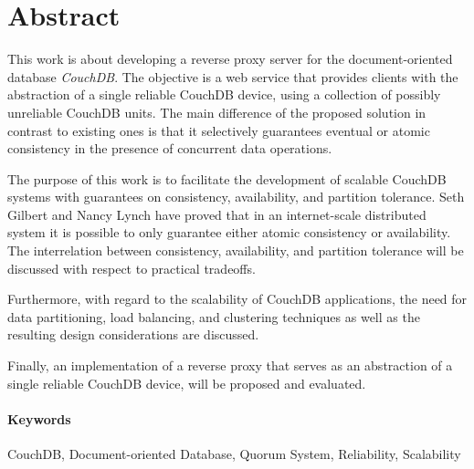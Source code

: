 \section*{Abstract}
This work is about developing a reverse proxy server for the document-oriented database \emph{CouchDB}. The objective is a web service that provides clients with the abstraction of a single reliable CouchDB device, using a collection of possibly unreliable CouchDB units. The main difference of the proposed solution in contrast to existing ones is that it selectively guarantees eventual or atomic consistency in the presence of concurrent data operations.

The purpose of this work is to facilitate the development of scalable CouchDB systems with guarantees on consistency, availability, and partition tolerance. Seth Gilbert and Nancy Lynch have proved that in an internet-scale distributed system it is possible to only guarantee either atomic consistency or availability. The interrelation between consistency, availability, and partition tolerance will be discussed with respect to practical tradeoffs.

Furthermore, with regard to the scalability of CouchDB applications, the need for data partitioning, load balancing, and clustering techniques as well as the resulting design considerations are discussed.

   Finally, an implementation of a reverse proxy that serves as an abstraction of a single reliable CouchDB device, will be proposed and evaluated.\\

\paragraph{Keywords}
CouchDB, Document-oriented Database, Quorum System, Reliability, Scalability
